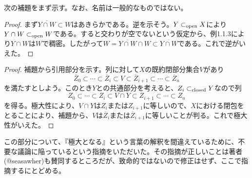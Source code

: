 \begin{rem}
  次の補題をまず示す。なお、名前は一般的なものではない。
\end{rem}
\begin{proof}
  まず$\overline{Y \cap W} \subset W$はあきらかである。逆を示そう。$Y \subset_{\text{open}} X$により$Y \cap W \subset_{\text{open}} W$である。すると交わりが空でないという仮定から、例1.1.3により$Y \cap W$は$W$で稠密。したがって$W = \overline{Y \cap W} \cap W \subset \overline{Y \cap W}$である。これで逆がいえた。
\end{proof}
\begin{proof}
  補題から引用部分を示す。列に対して$X$の既約閉部分集合$V$があり
  \[
\overline{Z}_0 \subset \cdots \subset \overline{Z}_i \subset V \subset \overline{Z}_{i+1} \subset \cdots \subset \overline{Z}_n
  \]
  を満たすとしよう。このとき$Y$との共通部分を考えると、$Z_i \subset_{\text{closed}} Y$なので列
  \[
  Z_0 \subset \cdots \subset Z_i \subset V \cap Y \subset Z_{i+1} \subset \cdots \subset Z_n
  \]
  を得る。極大性により、$V \cap Y$は$Z_i$または$Z_{i+1}$に等しいので、$X$における閉包をとることにより、補題から、$V$は$\overline{Z}_i$または$\overline{Z}_{i+1}$に等しいことが判る。これで極大性がいえた。
\end{proof}
\begin{rem}
  この部分について、『極大となる』という言葉の解釈を間違えているために、不要な議論に陥っているという指摘をいただいた。その指摘が正しいことは著者(@seasawher)も賛同するところだが、致命的ではないので修正はせず、ここで指摘するにとどめる。
\end{rem}


